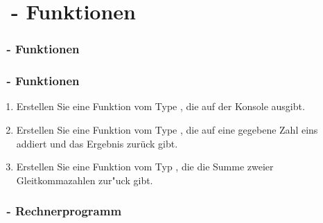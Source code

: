 \def\stitle{\theexercise\ - Funktionen}
\section{\stitle}
\begin{frame}
  \frametitle{\stitle}%
\tableofcontents[current]
\end{frame}

\begin{frame}[t]%
    \frametitle{\stitle}

\begin{enumerate}
\item Erstellen Sie eine Funktion vom Type , die  auf der Konsole ausgibt.
\item Erstellen Sie eine Funktion vom Type , die auf eine gegebene Zahl eins addiert und das Ergebnis zur\"uck gibt.
\item Erstellen Sie eine Funktion vom Typ , die die Summe zweier Gleitkommazahlen zur"uck gibt.
\end{enumerate}
\end{frame}

\begin{frame}[fragile]%
  \frametitle{\theexercise\ - Rechnerprogramm}%


\end{frame}

